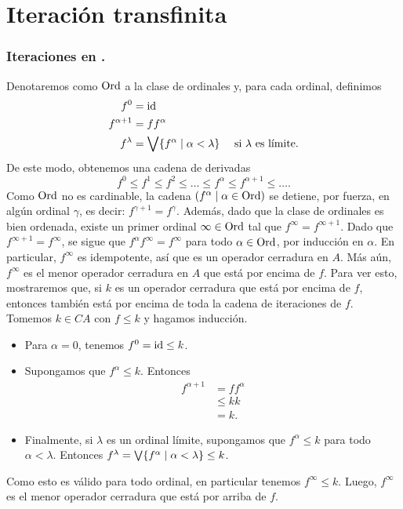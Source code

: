 \section{Iteración transfinita}
\subsubsection{Iteraciones en .}

Denotaremos como $\mathrm{Ord}$ a la clase de ordinales y, para cada
ordinal, definimos
\begin{align*}
  f^0 &= \mathrm{id} \\
  f^{\alpha+1} &= ff^\alpha \\
  f^\lambda &= \bigvee\{f^\alpha \mid \alpha<\lambda\}
    & \text{ si $\lambda$ es límite.}
\end{align*}
De este modo, obtenemos una cadena de derivadas
\[
  f^0\leq f^1\leq f^2\leq\dots\leq f^\alpha\leq f^{\alpha+1}
  \leq\dots
.\]
Como $\mathrm{Ord}$ no es cardinable, la cadena
$(f^\alpha \mid \alpha\in \mathrm{Ord} )$ se detiene, por fuerza, en
algún ordinal $\gamma$, es decir: $f^{\gamma+1}=f^\gamma$.
Además, dado que la clase de ordinales es bien ordenada,
existe un primer ordinal
$\infty\in\mathrm{Ord}$ tal que $f^\infty=f^{\infty+1}$.
Dado que $f^{\infty+1}=f^\infty$, se sigue que $f^\alpha
f^\infty=f^\infty$ para todo $\alpha\in\mathrm{Ord}$, por inducción en
$\alpha$. En particular,
$f^\infty$ es idempotente, así que es un operador cerradura en $A$.
Más aún, $f^\infty$ es el menor operador cerradura en $A$
que está por encima de $f$.
Para ver esto, mostraremos que, si $k$ es un operador cerradura
que está por encima de $f$, entonces también está por encima de
toda la cadena de iteraciones de $f$.
Tomemos $k\in CA$ con $f\leq k$ y hagamos inducción.
\begin{itemize}
  \item Para $\alpha=0$, tenemos $f^0=\mathrm{id}\leq k$.
  \item Supongamos que $f^\alpha\leq k$.
  Entonces
  \begin{align*}
    f^{\alpha+1}
    &= ff^\alpha \\
    &\leq kk \\
    &= k.
  \end{align*}
  \item Finalmente, si $\lambda$ es un ordinal límite, supongamos
  que $f^\alpha\leq k$ para todo $\alpha<\lambda$.
  Entonces
  $f^\lambda=\bigvee\{f^\alpha\mid \alpha<\lambda\}\leq k$.
\end{itemize}
Como esto es válido para todo ordinal, en particular tenemos
$f^\infty\leq k$.
Luego, $f^\infty$ es el menor operador cerradura que está por
arriba de $f$.

